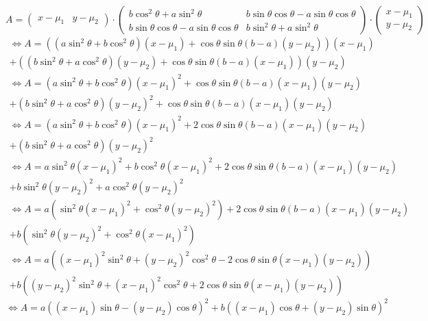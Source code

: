 \documentclass{article}
\begin{document}
$$ A=\begin{pmatrix}x-\mu_1 & y-\mu_2 \end{pmatrix}\cdot\begin{pmatrix} b\cos^{2} \theta + a\sin^{2} \theta & b\sin \theta\cos \theta - a\sin \theta\cos \theta \\ b\sin \theta\cos \theta - a\sin \theta\cos \theta & b\sin^{2} \theta + a\sin^{2} \theta\end{pmatrix}\cdot \begin{pmatrix}x-\mu_1 \\ y-\mu_2 \end{pmatrix}$$ 
\begin{multline*} \Leftrightarrow A=((a\sin^2\theta+b\cos^2\theta)(x-\mu_1)+\cos\theta\sin\theta(b-a)(y-\mu_2))(x-\mu_1)\\+((b\sin^2\theta+a\cos^2\theta)(y-\mu_2)+\cos\theta\sin\theta(b-a)(x-\mu_1))(y-\mu_2)\end{multline*}
\begin{multline*} \Leftrightarrow A=(a\sin^2\theta+b\cos^2\theta)(x-\mu_1)^2+\cos\theta\sin\theta(b-a)(x-\mu_1)(y-\mu_2)\\+(b\sin^2\theta+a\cos^2\theta)(y-\mu_2)^2+\cos\theta\sin\theta(b-a)(x-\mu_1)(y-\mu_2)\end{multline*}
\begin{multline*} \Leftrightarrow A=(a\sin^2\theta+b\cos^2\theta)(x-\mu_1)^2+2\cos\theta\sin\theta(b-a)(x-\mu_1)(y-\mu_2)\\+(b\sin^2\theta+a\cos^2\theta)(y-\mu_2)^2\end{multline*}
\begin{multline*} \Leftrightarrow A=a\sin^2\theta(x-\mu_1)^2+b\cos^2\theta(x-\mu_1)^2+2\cos\theta\sin\theta(b-a)(x-\mu_1)(y-\mu_2)\\+b\sin^2\theta(y-\mu_2)^2+a\cos^2\theta(y-\mu_2)^2\end{multline*}
\begin{multline*} \Leftrightarrow A=a(\sin^2\theta(x-\mu_1)^2+\cos^2\theta(y-\mu_2)^2)+2\cos\theta\sin\theta(b-a)(x-\mu_1)(y-\mu_2)\\+b(\sin^2\theta(y-\mu_2)^2+\cos^2\theta(x-\mu_1)^2)\end{multline*}
\begin{multline*} \Leftrightarrow A=a((x-\mu_1)^2\sin^2\theta+(y-\mu_2)^2\cos^2\theta-2\cos\theta\sin\theta(x-\mu_1)(y-\mu_2))\\+b((y-\mu_2)^2\sin^2\theta+(x-\mu_1)^2\cos^2\theta+2\cos\theta\sin\theta(x-\mu_1)(y-\mu_2))\end{multline*}
$$ \Leftrightarrow A=a((x-\mu_1)\sin\theta-(y-\mu_2)\cos\theta)^{2}+b((x-\mu_1)\cos\theta+(y-\mu_2)\sin\theta)^{2}$$
\end{document}

